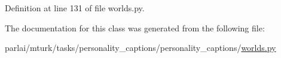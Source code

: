 Definition at line 131 of file worlds.\+py.



The documentation for this class was generated from the following file\+:\begin{DoxyCompactItemize}
\item 
parlai/mturk/tasks/personality\+\_\+captions/personality\+\_\+captions/\hyperlink{parlai_2mturk_2tasks_2personality__captions_2personality__captions_2worlds_8py}{worlds.\+py}\end{DoxyCompactItemize}
